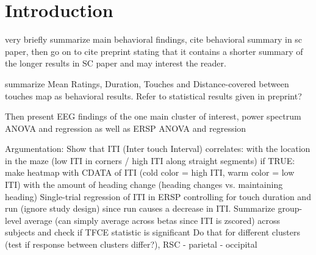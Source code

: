 \section{Introduction}

very briefly summarize main behavioral findings, cite behavioral summary in sc paper, then go on to cite preprint stating that it contains a shorter summary of the longer results in SC paper and may interest the reader.

summarize Mean Ratings, Duration, Touches and Distance-covered between touches map as behavioral results. Refer to statistical results given in preprint?

Then present EEG findings of the one main cluster of interest, power spectrum ANOVA and regression as well as ERSP ANOVA and regression

Argumentation:
Show that ITI (Inter touch Interval) correlates:
with the location in the maze (low ITI in corners / high ITI along straight segments)
if TRUE: make heatmap with CDATA of ITI (cold color = high ITI, warm color = low ITI)
with the amount of heading change (heading changes vs. maintaining heading)
Single-trial regression of ITI in ERSP controlling for touch duration and run (ignore study design) since run causes a decrease in ITI.
Summarize group-level average (can simply average across betas since ITI is zscored) across subjects and check if TFCE statistic is significant
Do that for different clusters (test if response between clusters differ?), RSC - parietal - occipital




